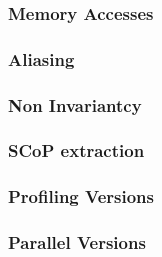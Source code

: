 \red
\begin{shaded}
\subsubsection{Memory Accesses}

\subsubsection{Aliasing}

\subsubsection{Non Invariantcy}

\subsubsection{SCoP extraction}

\subsubsection{Profiling Versions}

\subsubsection{Parallel Versions}

\end{shaded}

